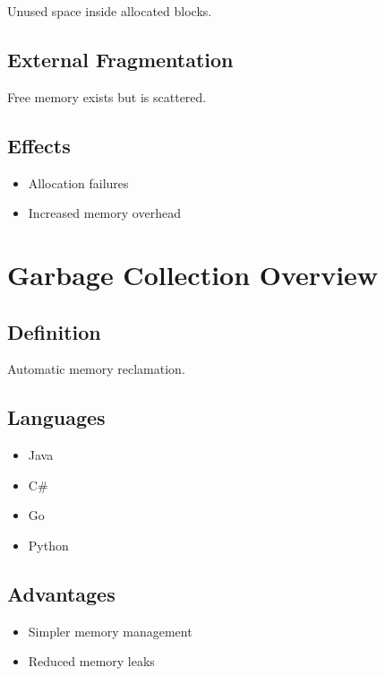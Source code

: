 Unused space inside allocated blocks.

\subsection{External Fragmentation}

Free memory exists but is scattered.

\subsection{Effects}

\begin{itemize}
\item Allocation failures
\item Increased memory overhead
\end{itemize}

\section{Garbage Collection Overview}

\subsection{Definition}

Automatic memory reclamation.

\subsection{Languages}

\begin{itemize}
\item Java
\item C\#
\item Go
\item Python
\end{itemize}

\subsection{Advantages}

\begin{itemize}
\item Simpler memory management
\item Reduced memory leaks
\end{itemize}


